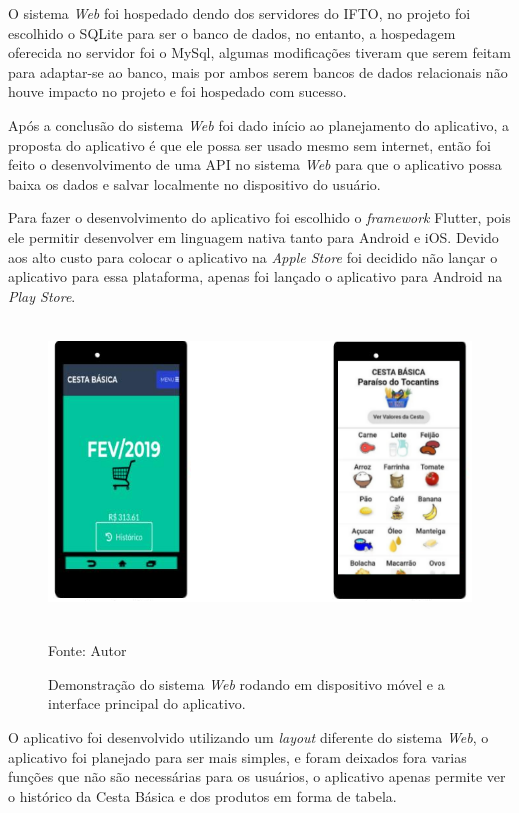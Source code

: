 \documentclass{ifto-tex}
\begin{document}
O sistema \textit{Web} foi hospedado dendo dos servidores do IFTO, no projeto foi escolhido o SQLite para ser o banco de dados, no entanto, a hospedagem oferecida no servidor foi o MySql, algumas modificações tiveram que serem feitam para adaptar-se ao banco, mais por ambos serem bancos de dados relacionais não houve impacto no projeto e foi hospedado com sucesso.

Após a conclusão do sistema \textit{Web} foi dado início ao planejamento do aplicativo, a proposta do aplicativo é que ele possa ser usado mesmo sem internet, então foi feito o desenvolvimento de uma API no sistema \textit{Web} para que o aplicativo possa baixa os dados e salvar localmente no dispositivo do usuário.

Para fazer o desenvolvimento do aplicativo foi escolhido o \textit{framework} Flutter, pois ele permitir desenvolver em linguagem nativa tanto para Android e iOS. Devido aos alto custo para colocar o aplicativo na \textit{Apple Store} foi decidido não lançar o aplicativo para essa plataforma, apenas foi lançado o aplicativo para Android na \textit{Play Store}.

\begin{figure}[!h]
	\begin{center}
		\includegraphics[width=12.0cm, height= 8.0cm]{movel.png}    %
		
		Fonte: Autor
		\caption{Demonstração do sistema \textit{Web} rodando em dispositivo móvel e a interface principal do aplicativo.} 
		\label{fig:faces}
	\end{center}
\end{figure}

O aplicativo foi desenvolvido utilizando um \textit{layout} diferente do sistema \textit{Web}, o aplicativo foi planejado para ser mais simples, e foram deixados fora varias funções que não são necessárias para os usuários, o aplicativo apenas permite ver o histórico da Cesta Básica e dos produtos em forma de tabela.
\end{document}
